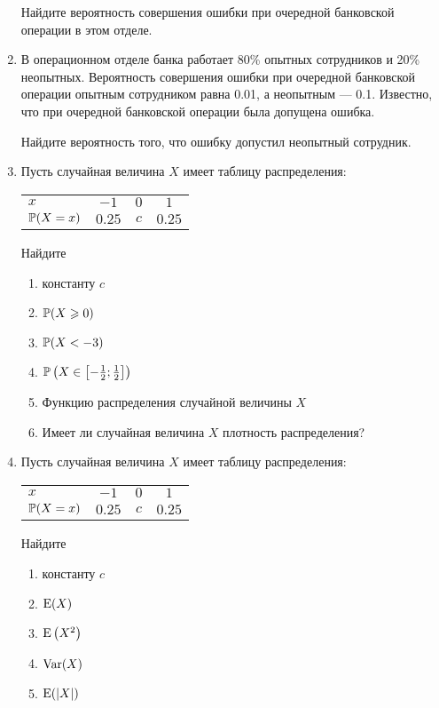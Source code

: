 \begin{enumerate}
Найдите вероятность совершения ошибки при очередной банковской операции в этом отделе.

\item  В операционном отделе банка работает 80\% опытных сотрудников и 20\%
неопытных. Вероятность совершения ошибки при очередной банковской операции
опытным сотрудником равна 0.01, а неопытным — 0.1.
Известно, что при очередной банковской операции была допущена ошибка.

Найдите вероятность того, что ошибку допустил неопытный сотрудник.

\item  Пусть случайная величина $X$ имеет таблицу распределения:

\begin{tabular}{lccc}
	\toprule
	$x$ & $-1$  & $0$  & $1$ \\
	$\P(X = x)$ & $0.25$  & $c$  & $0.25$ \\
  \bottomrule
\end{tabular}

Найдите
	\begin{enumerate}
	\item константу $c$
	\item $\P(X \geq 0)$
	\item $\P(X < -3)$
	\item $\P\left(X \in \left[-\frac{1}{2}; \frac{1}{2}\right]\right)$
	\item Функцию распределения случайной величины $X$
	\item Имеет ли случайная величина $X$ плотность распределения?
	\end{enumerate}

\item  Пусть случайная величина $X$ имеет таблицу распределения: %

\begin{tabular}{lccc}
\toprule
$x$ & $-1$  & $0$  & $1$ \\
$\P(X = x)$ & $0.25$ & $c$  & $0.25$ \\
\bottomrule
\end{tabular}

Найдите
\begin{enumerate}
	\item константу $c$
	\item $\E(X)$
	\item $\E\left(X^2\right)$
	\item $\Var(X)$
	\item $\E(|X|)$
\end{enumerate}


\end{enumerate}

